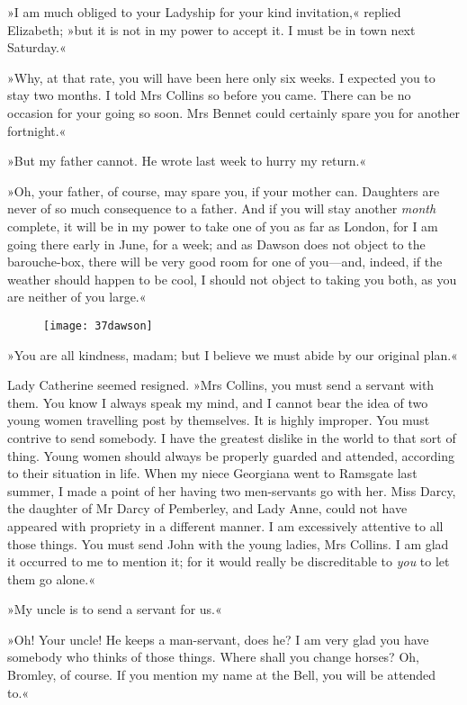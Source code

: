»I am much obliged to your Ladyship for your kind invitation,« replied Elizabeth; »but it is not in my power to accept it. I must be in town next Saturday.«

»Why, at that rate, you will have been here only six weeks. I expected you to stay two months. I told Mrs Collins so before you came. There can be no occasion for your going so soon. Mrs Bennet could certainly spare you for another fortnight.«

»But my father cannot. He wrote last week to hurry my return.«

»Oh, your father, of course, may spare you, if your mother can. Daughters are never of so much consequence to a father. And if you will stay another \textit{month} complete, it will be in my power to take one of you as far as London, for I am going there early in June, for a week; and as Dawson does not object to the barouche-box, there will be very good room for one of you—and, indeed, if the weather should happen to be cool, I should not object to taking you both, as you are neither of you large.«

\begin{figure}[tbh]
\centering
\texttt{[image: 37dawson]}
\end{figure}

»You are all kindness, madam; but I believe we must abide by our original plan.«

Lady Catherine seemed resigned. »Mrs Collins, you must send a servant with them. You know I always speak my mind, and I cannot bear the idea of two young women travelling post by themselves. It is highly improper. You must contrive to send somebody. I have the greatest dislike in the world to that sort of thing. Young women should always be properly guarded and attended, according to their situation in life. When my niece Georgiana went to Ramsgate last summer, I made a point of her having two men-servants go with her. Miss Darcy, the daughter of Mr Darcy of Pemberley, and Lady Anne, could not have appeared with propriety in a different manner. I am excessively attentive to all those things. You must send John with the young ladies, Mrs Collins. I am glad it occurred to me to mention it; for it would really be discreditable to \textit{you} to let them go alone.«

»My uncle is to send a servant for us.«

»Oh! Your uncle! He keeps a man-servant, does he? I am very glad you have somebody who thinks of those things. Where shall you change horses? Oh, Bromley, of course. If you mention my name at the Bell, you will be attended to.«

